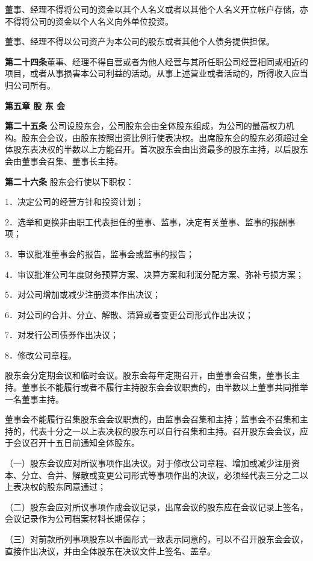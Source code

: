 董事、经理不得将公司的资金以其个人名义或者以其他个人名义开立帐户存储，亦不得将公司的资金以个人名义向外单位投资。

董事、经理不得以公司资产为本公司的股东或者其他个人债务提供担保。

\textbf{第二十四条}\quad  董事、经理不得自营或者为他人经营与其所任职公司经营相同或相近的项目，或者从事损害本公司利益的活动。从事上述营业或者活动的，所得收入应当归公司所有。


\begin{center}
\textbf{第五章 \quad  股 东 会}
\end{center}

\textbf{第二十五条} \quad 公司设股东会，公司股东会由全体股东组成，为公司的最高权力机构。股东会会议，由股东按照出资比例行使表决权。出席股东会的股东必须超过全体股东表决权的半数以上方能召开。首次股东会由出资最多的股东主持，以后股东会由董事会召集、董事长主持。

\textbf{第二十六条}  \quad 股东会行使以下职权：

    1．决定公司的经营方针和投资计划；

    2．选举和更换非由职工代表担任的董事、监事，决定有关董事、监事的报酬事项；

    3．审议批准董事会的报告，监事会或监事的报告；

    4．审议批准公司年度财务预算方案、决算方案和利润分配方案、弥补亏损方案；

5．对公司增加或减少注册资本作出决议；

6．对公司的合并、分立、解散、清算或者变更公司形式作出决议；

    7．对发行公司债券作出决议；

 8．修改公司章程。
 
 股东会分定期会议和临时会议。股东会每年定期召开，由董事会召集，董事长主持。董事长不能履行或者不履行主持股东会会议职责的，由半数以上董事共同推举一名董事主持。
 
董事会不能履行召集股东会会议职责的，由监事会召集和主持；监事会不召集和主持的，代表十分之一以上表决权的股东可以自行召集和主持。召开股东会会议，应于会议召开十五日前通知全体股东。

（一）股东会议应对所议事项作出决议。对于修改公司章程、增加或减少注册资本、分立、合并、解散或变更公司形式等事项作出的决议，必须经代表三分之二以上表决权的股东同意通过；

（二）股东会应对所议事项作成会议记录，出席会议的股东应在会议记录上签名，会议记录作为公司档案材料长期保存；

（三）对前款所列事项股东以书面形式一致表示同意的，可以不召开股东会会议，直接作出决议，并由全体股东在决议文件上签名、盖章。


